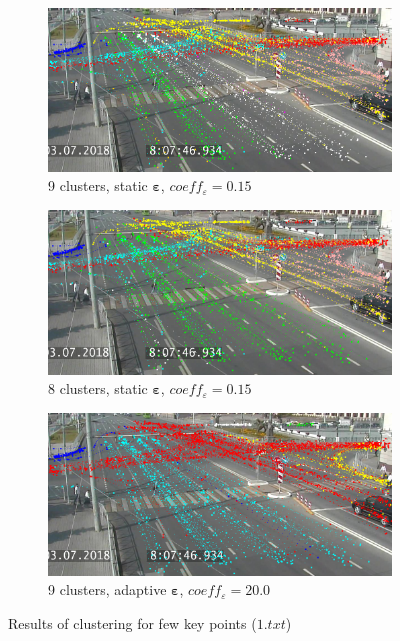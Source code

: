 \begin{figure}[!htb]
	\centering
	\begin{subfigure}[!htb]{0.32\textwidth}
		\centering{}
		\includegraphics[width=\textwidth]{images/few-kp-cl-st-9.png}
		\caption{9 clusters, static $\bm{\varepsilon}$, $coeff_\varepsilon = 0.15$}
	\end{subfigure}
	\hfill
	\begin{subfigure}[!htb]{0.32\textwidth}
		\centering{}
		\includegraphics[width=\textwidth]{images/few-kp-cl-st-8.png}
		\caption{8 clusters, static $\bm{\varepsilon}$, $coeff_\varepsilon = 0.15$}
	\end{subfigure}	
	\hfill
	\begin{subfigure}[!htb]{0.32\textwidth}
		\centering{}
		\includegraphics[width=\textwidth]{images/few-kp-cl-ad-9.png}
		\caption{9 clusters, adaptive $\bm{\varepsilon}$, $coeff_\varepsilon = 20.0$}
	\end{subfigure}	
	\caption{Results of clustering for few key points ($1.txt$)}
	\label{fig:few_kp_cl}
\end{figure}

